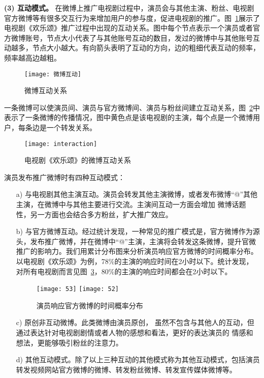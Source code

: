 \textbf{(3) 互动模式。}
在微博上推广电视剧过程中，演员会与其他主演、粉丝、电视剧官方微博等有很多交互行为来增加用户的参与度，促进电视剧的推广。图~\ref{inter}展示了电视剧《欢乐颂》推广过程中出现的互动关系。图中每个节点表示一个演员或者官方微博账号，节点大小代表了与其他账号互动的数目，发过的微博中与其他账号互动越多，节点大小越大。有向箭头表明了互动的方向，边的粗细代表互动的频率，频率越高边越粗。

\begin{figure}[!htbp]
\centering
\texttt{[image: 微博互动]}
\caption{微博互动关系}
\label{inter}
\end{figure}

一条微博可以使演员间、演员与官方微博间、演员与粉丝间建立互动关系，图~\ref{inter2}中表示了一条微博的传播情况，图中黄色点是该电视剧的主演，每个点是一个微博用户，每条边是一个转发关系。
\begin{figure}[!htbp]
\centering
\texttt{[image: interaction]}
\caption{电视剧《欢乐颂》的微博互动关系}
\label{inter2}
\end{figure}

演员发布推广微博时有四种互动模式：
\begin{itemize}

\item[a)]与电视剧其他主演互动。演员会转发其他主演微博，或者发布微博“@”其他主演，在微博中与其他主要进行交流。主演间互动一方面会增加 微博话题性，另一方面也会结合多方粉丝，扩大推广效应。

\item[b)]与官方微博互动。经过统计发现，一种常见的推广模式是，官方微博作为源头，发布推广微博，并在微博中“@”主演，主演将会转发这条微博，提升官微推广的影响力。我们用累计分布图来分析演员响应官方微博的时间概率分布。以电视剧《欢乐颂》为例，78\%的主演的响应时间在2小时以下。统计发现，对所有电视剧而言见图~\ref{fig}，80\%的主演的响应时间都会在2小时以下。

\begin{figure}[h]
  \centering%
    {\texttt{[image: 53]}}
      {\texttt{[image: 52]}}
  \caption{演员响应官方微博的时间概率分布}
  \label{fig}
\end{figure}

\item[c)]原创非互动微博。此类微博由演员原创， 虽然不包含与其他人的互动，但通过表达针对电视剧剧情或者人物的感想和看法，更好的表达演员的 情感和想法，更能够吸引粉丝的注意力。

\item[d)]其他互动模式。除了以上三种互动的其他模式称为其他互动模式，包括演员转发视频网站官方微博的微博、转发粉丝微博、转发宣传媒体微博等。

\end{itemize}

